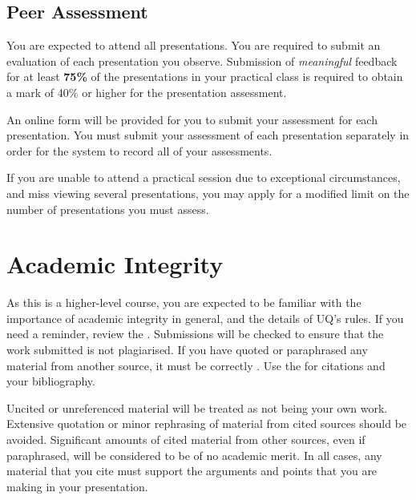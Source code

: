 \documentclass{csse4400}
\begin{document}
\subsection{Peer Assessment}
You are expected to attend all presentations.
You are required to submit an evaluation of each presentation you observe.
Submission of \emph{meaningful} feedback for at least \textbf{75\%} of the presentations in your practical class
is required to obtain a mark of 40\% or higher for the presentation assessment.

An online form will be provided for you to submit your assessment for each presentation.
You must submit your assessment of each presentation separately in order for the system to record all of your assessments.

If you are unable to attend a practical session due to exceptional circumstances,
and miss viewing several presentations,
you may apply for a modified limit on the number of presentations you must assess.

\section{Academic Integrity}
As this is a higher-level course, you are expected to be familiar with the importance of academic integrity in general, and the details of UQ's rules.
If you need a reminder, review the .
Submissions will be checked to ensure that the work submitted is not plagiarised.
If you have quoted or paraphrased any material from another source, it must be correctly .
Use the  for citations and your bibliography.

Uncited or unreferenced material will be treated as not being your own work.
Extensive quotation or minor rephrasing of material from cited sources should be avoided.
Significant amounts of cited material from other sources, even if paraphrased, will be considered to be of no academic merit.
In all cases, any material that you cite must support the arguments and points that you are making in your presentation.
\end{document}

